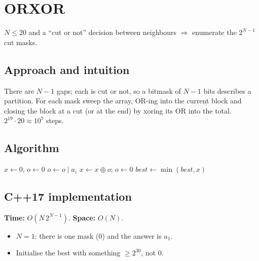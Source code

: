 \section{ORXOR}
\label{sec:b-orxor}


\begin{patternbox}
$N\le20$ and a ``cut or not'' decision between neighbours $\Rightarrow$
enumerate the $2^{N-1}$ cut masks.
\end{patternbox}

\subsection*{Approach and intuition}

There are $N-1$ gaps; each is cut or not, so a bitmask of $N-1$ bits
describes a partition. For each mask sweep the array, OR-ing into the current
block and closing the block at a cut (or at the end) by xoring its OR into the
total. $2^{19}\cdot20\approx10^7$ steps.

\subsection*{Algorithm}
\begin{algorithmic}[1]
  \State $x\gets0$, $o\gets0$
    \State $o\gets o\mid a_i$
     $x\gets x\oplus o$; $o\gets0$ \EndIf
  \EndFor
  \State $best\gets\min(best,x)$
\EndFor
\end{algorithmic}


\subsection*{C++17 implementation}

\begin{complexitybox}
\textbf{Time:} $O(N\,2^{N-1})$. \textbf{Space:} $O(N)$.
\end{complexitybox}

\begin{pitfallbox}
\begin{itemize}
  \item $N=1$: there is one mask ($0$) and the answer is $a_1$.
  \item Initialise the best with something $\ge2^{30}$, not $0$.
\end{itemize}
\end{pitfallbox}
